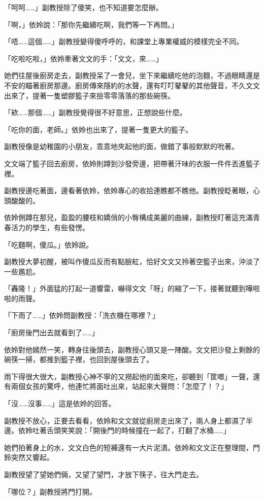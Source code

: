 「呵呵……」副教授除了傻笑，也不知道要怎麼辦。

「啊，」依姈說：「那你先繼續吃啊，我們等一下再問。」

「唔……這個……」副教授變得傻呼呼的，和課堂上專業權威的模樣完全不同。

「吃啦吃啦，」依姈牽著文文的手：「文文，來……」

她們往屋後廚房走去，副教授呆了一會兒，坐下來繼續吃他的泡麵，不過眼睛還是不安的瞄著廚房那邊。廚房傳來隱約的水聲，還有叮叮鼕鼕的其他聲音，不久文文出來了，提著一隻塑膠籃子來撿零零落落的那些碗筷。

「欸……那個……」副教授覺得很不好意思，正想說些什麼。

「吃你的面，老師。」依姈也出來了，提著一隻更大的籃子。

副教授像是幼稚園的小朋友，乖乖地夾起他的面，做錯了事般默默的吮著。

文文端了籃子回去廚房，依姈則蹲到沙發旁邊，把帶著汗味的衣服一件件丟進籃子裡。

副教授邊吃著面，邊看著依姈，依姈專心的收拾連瞧都不瞧他。副教授眨著眼，心頭酸酸的。

依姈側蹲在那兒，盈盈的腰枝和嬌俏的小臀構成美麗的曲線，副教授盯著這充滿青春活力的學生，有些發愣。

「吃麵啊，傻瓜。」依姈說。

副教授大夢初醒，被叫作傻瓜反而有點臉紅，恰好文文又拎著空籃子出來，沖淡了一些尷尬。

「轟隆！」外面猛的打起一道響雷，嚇得文文「呀」的縮了一下，接著就聽到嘩啦啦的雨聲。

「下雨了……」依姈問副教授：「洗衣機在哪裡？」

「廚房後門出去就看到了……」

依姈對他嫣然一笑，轉身往後頭去，副教授心頭又是一陣酸。文文把沙發上剩餘的碗筷一掃，都推到籃子裡，也回到屋後頭去了。

雨下得很大很大，副教授心神不寧的又撈起他的面來吃，卻聽到「筐啷」一聲，還有兩個女孩的驚呼，他連忙將面吐出來，站起來大聲問：「怎麼了！？」

「沒……沒事……」這是依姈的回答。

副教授不放心，正要去看看，依姈和文文就從廚房走出來了，兩人身上都濕了半邊。依姈吐著舌頭笑笑說：「開後門的時候撞在一起了，打翻了水桶……」

她們拍著身上的水，文文白色的短褲還有一大片泥漬。依姈和文文正在整理間，門鈴突然又響起。

副教授望了望她們倆，又望了望門，才放下筷子，往大門走去。

「哪位？」副教授將門打開。

